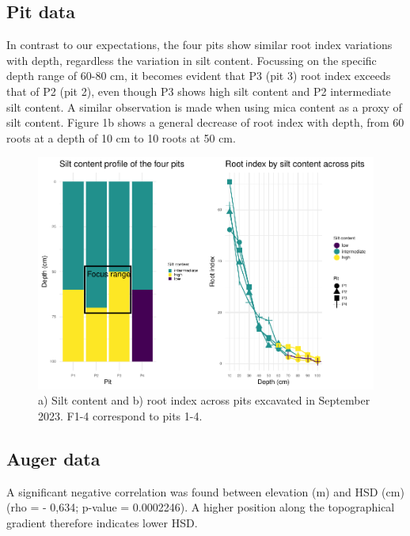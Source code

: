 \documentclass[fleqn,12pt]{latex/stylish_article} %
\begin{document}
\hypertarget{pit-data}{%
\subsection{Pit data}\label{pit-data}}

In contrast to our expectations, the four pits show similar root index variations with depth, regardless the variation in silt content. Focussing on the specific depth range of 60-80 cm, it becomes evident that P3 (pit 3) root index exceeds that of P2 (pit 2), even though P3 shows high silt content and P2 intermediate silt content. A similar observation is made when using mica content as a proxy of silt content. Figure 1b shows a general decrease of root index with depth, from 60 roots at a depth of 10 cm to 10 roots at 50 cm.



\scriptsize

\begin{figure}

{\centering \includegraphics[width=0.8\linewidth,]{pedoP16-report_files/figure-latex/pit-1} 

}

\caption{a) Silt content and b) root index across pits excavated in September 2023. F1-4 correspond to pits 1-4.}\label{fig:pit}
\end{figure}

\normalsize

\hypertarget{auger-data}{%
\subsection{Auger data}\label{auger-data}}

A significant negative correlation was found between elevation (m) and HSD (cm) (rho = - 0,634; p-value = 0.0002246). A higher position along the topographical gradient therefore indicates lower HSD.
\end{document}
